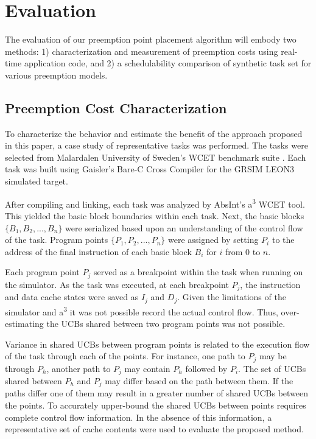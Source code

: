 \section{Evaluation}\label{sec:evaluation}

The evaluation of our preemption point placement algorithm will embody
two methods: 1) characterization and measurement of preemption costs
using real-time application code, and 2) a schedulability comparison
of synthetic task set for various preemption models. 

\subsection {Preemption Cost
  Characterization}\label{sec:preemption_cost_measurement} 
To characterize the behavior and estimate the benefit of the approach
proposed in this paper, a case study of representative tasks was
performed. The tasks were selected from Malardalen University of
Sweden's WCET benchmark suite \cite{mrtc:01}. Each task was built using Gaisler's
Bare-C Cross Compiler \cite{gaisler:01} for the GRSIM
LEON3 \cite{gaisler:02} simulated target. 

After compiling and linking, each task was analyzed by AbsInt's
a\textsuperscript{3} WCET \cite{absint:01} tool. This yielded the basic block
boundaries within each task. Next, the basic blocks
${\{B_1, B_2, ..., B_n\}}$ were serialized based upon an understanding of
the control flow of the task. Program points
${\{P_1, P_2, ..., P_n\}}$ were assigned by setting ${P_i}$ to the
address of the final instruction of each basic block ${B_i}$ for ${i}$
from ${0}$ to ${n}$.

Each program point ${P_j}$ served as a breakpoint within the task when
running on the simulator. As the task was executed, at each breakpoint
${P_j}$, the instruction and data cache states were saved as ${I_j}$
and ${D_j}$. Given the limitations of the simulator and
a\textsuperscript{3} it was not possible record the actual control
flow. Thus, over-estimating the UCBs shared between two
program points was not possible. 

Variance in shared UCBs between program points is related to the
execution flow of the task through each of the points. For instance,
one path to ${P_j}$ may be through ${P_h}$, another path to ${P_j}$
may contain ${P_h}$ followed by ${P_i}$. The set of UCBs shared
between ${P_h}$ and ${P_j}$ may differ based on the path between
them. If the paths differ one of them may result in a greater number
of shared UCBs between the points. To accurately upper-bound the
shared UCBs between points requires complete control flow
information. In the absence of this information, a representative set
of cache contents were used to evaluate the proposed method.

